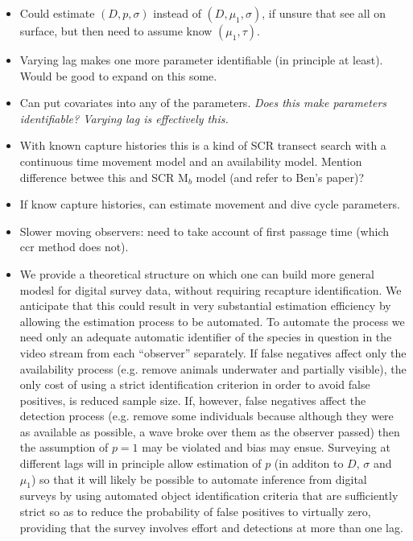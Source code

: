 \documentclass[useAMS, usenatbib, referee]{biom}\usepackage[]{graphicx}\usepackage[]{color}
\begin{document}
\begin{itemize}

\item Could estimate $(D,p,\sigma)$ instead of $(D,\mu_1,\sigma)$, if unsure that see all on surface, but then need to assume know $(\mu_1,\tau)$.

\item Varying lag makes one more parameter identifiable (in principle at least). Would be good to expand on this some.

\item Can put covariates into any of the parameters. \textit{Does this make parameters identifiable? Varying lag is effectively this.}

\item With known capture histories this is a kind of SCR transect search with a continuous time movement model and an availability model. Mention difference betwee this and SCR M$_b$ model (and refer to Ben's paper)?

\item If know capture histories, can estimate movement and dive cycle parameters.

\item Slower moving observers: need to take account of first passage time (which ccr method does not).

\item We provide a theoretical structure on which one can build more general modesl for digital survey data, without requiring recapture identification. We anticipate that this could result in very substantial estimation efficiency by allowing the estimation process to be automated. To automate the process we need only an adequate automatic identifier of the species in question in the video stream from each ``observer'' separately. If false negatives affect only the availability process (e.g. remove animals underwater and partially visible), the only cost of using a strict identification criterion in order to avoid false positives, is reduced sample size. If, however, false negatives affect the detection process (e.g. remove some individuals because although they were as available as possible, a wave broke over them as the observer passed) then the assumption of $p=1$ may be violated and bias may ensue. Surveying at different lags will in principle allow estimation of $p$ (in additon to $D$, $\sigma$ and $\mu_1$) so that it will likely be possible to automate inference from digital surveys by using automated object identification criteria that are sufficiently strict so as to reduce the probability of false positives to virtually zero, providing that the survey involves effort and detections at more than one lag.

\end{itemize}
\end{document}

